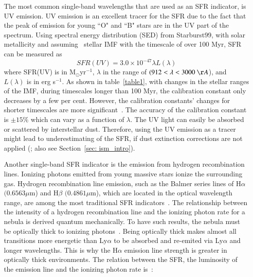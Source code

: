 The most common single-band wavelengths that are used as an SFR indicator, is UV emission.
UV emission is an excellent tracer for the SFR due to the fact that the peak of emission for young  ``O" and ``B" stars are in the UV part of the spectrum.
Using spectral energy distribution (SED) from Starburst99, with solar metallicity and assuming~\cite{Kroupa01} stellar IMF with the timescale of over 100 Myr, SFR can be measured as~\citep{Leitherer99}
\begin{equation}
SFR(UV) = 3.0 \times 10^{-47}\lambda L(\lambda)
\end{equation}
where SFR(UV) is in M$_{\odot}$yr$^{-1}$, $\lambda$ in the range of $(912< \lambda < 3000~\AA$), and $L(\lambda)$ is in erg s$^{-1}$. 
As shown in table~\ref{table1}, with changes in the stellar ranges of the IMF, during timescales longer than 100 Myr, the calibration constant only decreases by a few per cent.
However, the calibration constants' changes for shorter timescales are more significant~\citep{Calzetti13}. 
The accuracy of the calibration constant is $\pm 15\%$ which can vary as a function of $\lambda$. 
The UV light can easily be absorbed or scattered by interstellar dust. 
Therefore, using the UV emission as a tracer might lead to underestimating of the SFR, if dust extinction corrections are not applied (\cite{Kennicutt12}; also see Section~\ref{sec: ism_intro}). 

Another single-band SFR indicator is the emission from hydrogen recombination lines. 
Ionizing photons emitted from young massive stars ionize the surrounding gas. Hydrogen recombination line emission, such as the Balmer series lines of H${\alpha}$ $(0.6563 \mu$m) and H${\beta}$ $(0.4861 \mu$m), which are located in the optical wavelength range, are among the most traditional SFR indicators~\citep{Kennicutt98a}. 
The relationship between the intensity of a hydrogen recombination line and the ionizing photon rate for a nebula is derived quantum mechanically. 
To have such results, the nebula must be optically thick to ionizing photons~\citep{Osterbrock06}. 
Being optically thick makes almost all transitions more energetic than Ly${\alpha}$ to be absorbed and re-emited via Ly${\alpha}$ and longer wavelengths.
This is why the H${\alpha}$ emission line strength is greater in optically thick environments. The relation between the SFR, the luminosity of the \halpha emission line and the ionizing photon rate is~\citep[e.g.,][]{Osterbrock06, Kennicutt98b}:

